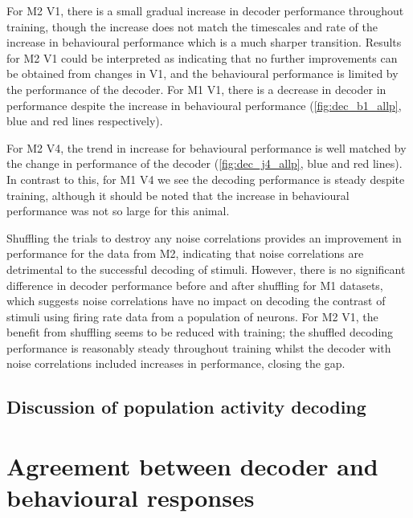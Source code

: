 For \ac{M2} \ac{V1}, there is a small gradual increase in decoder performance throughout training, though the increase does not match the timescales and rate of the increase in behavioural performance which is a much sharper transition.
Results for \ac{M2} \ac{V1} could be interpreted as indicating that no further improvements can be obtained from changes in \ac{V1}, and the behavioural performance is limited by the performance of the decoder.
For \ac{M1} \ac{V1}, there is a decrease in decoder in performance despite the increase in behavioural performance (\autoref{fig:dec_b1_allp}, blue and red lines respectively).

For \ac{M2} \ac{V4}, the trend in increase for behavioural performance is well matched by the change in performance of the decoder (\autoref{fig:dec_j4_allp}, blue and red lines).
In contrast to this, for \ac{M1} \ac{V4} we see the decoding performance is steady despite training, although it should be noted that the increase in behavioural performance was not so large for this animal.


Shuffling the trials to destroy any noise correlations provides an improvement in performance for the data from \ac{M2}, indicating that noise correlations are detrimental to the successful decoding of stimuli.
However, there is no significant difference in decoder performance before and after shuffling for \ac{M1} datasets, which suggests noise correlations have no impact on decoding the contrast of stimuli using firing rate data from a population of neurons.
For \ac{M2} \ac{V1}, the benefit from shuffling seems to be reduced with training; the shuffled decoding performance is reasonably steady throughout training whilst the decoder with noise correlations included increases in performance, closing the gap.


\subsection{Discussion of population activity decoding}


\section{Agreement between decoder and behavioural responses}


